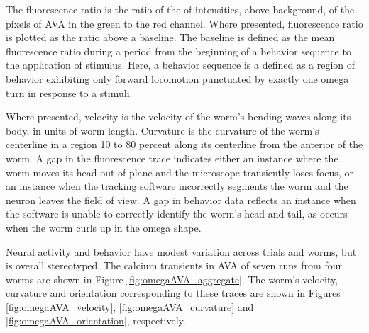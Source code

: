 The fluorescence ratio is the ratio of the of intensities,  above background, of the pixels of AVA in the green to the red channel. Where presented, fluorescence ratio is plotted as the ratio above a baseline. The baseline is defined as the mean fluorescence ratio during a period from the beginning of a behavior sequence to the application of stimulus. Here, a behavior sequence is a defined as a region of behavior exhibiting only forward locomotion punctuated by exactly one omega turn in response to a stimuli. 

Where presented, velocity is the velocity of the worm's bending waves along its body, in units of worm length. Curvature is the curvature of the worm's centerline in a region 10 to 80 percent along its centerline from the anterior of the worm. A gap in the fluorescence trace indicates either an instance where the worm moves its head out of plane and the microscope transiently loses focus, or an instance when the tracking software incorrectly segments the worm and the neuron leaves the field of view.  A gap in behavior data reflects an instance when the software is unable to correctly identify the worm's head and tail, as occurs when the worm curls up in the omega shape. 


Neural activity and behavior have modest variation across trials and worms, but is overall stereotyped. The calcium transients in AVA of seven runs from four worms are shown in Figure \ref{fig:omegaAVA_aggregate}. The worm's velocity, curvature and orientation corresponding to these traces are shown in Figures \ref{fig:omegaAVA_velocity}, \ref{fig:omegaAVA_curvature} and \ref{fig:omegaAVA_orientation}, respectively. 




